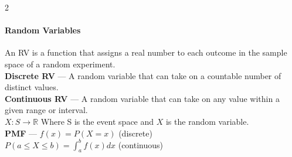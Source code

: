 \documentclass[10pt,letterpaper]{article}
\begin{document}
\begin{multicols}{2}
\paragraph*{Random Variables}
An RV is a function that assigns a real number to each outcome in the sample space of a random experiment.\\
\textbf{Discrete RV} --- A random variable that can take on a countable number of distinct values.\\
\textbf{Continuous RV} --- A random variable that can take on any value within a given range or interval.\\
$X: S \rightarrow \mathbb{R}$ Where S is the event space and \( X \) is the random variable.\\
\textbf{PMF} --- $f(x) = P(X = x)$ (discrete)\\
$P(a \leq X \leq b) = \int_{a}^{b} f(x)dx$ (continuous)\\

\bigbreak


\end{multicols}
\end{document}
